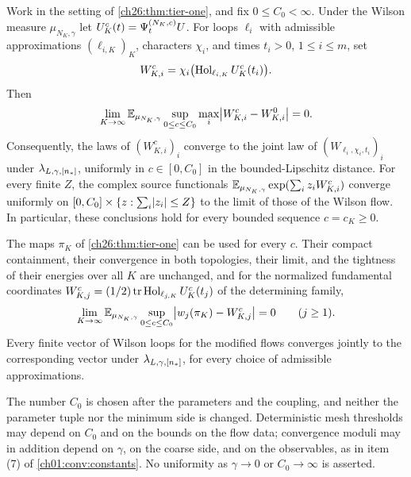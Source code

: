 \begin{theorem}\label{ch26:thm:bounded-quartic-flow-universality}
Work in the setting of \cref{ch26:thm:tier-one}, and fix $0\le C_0<\infty$. Under the Wilson measure $\mu_{N_K,\gamma}$ let $U_K^c(t)=\Psi^{(N_K,c)}_tU$. For loops $\ell_i$ with admissible approximations $(\ell_{i,K})_K$, characters $\chi_i$, and times $t_i>0$, $1\le i\le m$, set
\[
 W^c_{K,i}=\chi_i\bigl(\operatorname{Hol}_{\ell_{i,K}}U^c_K(t_i)\bigr).
\]
Then
\begin{equation}\label{ch26:eq:alternative-original-comparison}
 \lim_{K\to\infty}\mathbb E_{\mu_{N_K,\gamma}}\sup_{0\le c\le C_0}\max_i\bigl\lvert W^c_{K,i}-W^0_{K,i}\bigr\rvert=0.
\end{equation}
Consequently, the laws of $(W^c_{K,i})_i$ converge to the joint law of $(W_{\ell_i,\chi_i,t_i})_i$ under $\lambda_{L,\gamma,[n_*]}$, uniformly in $c\in[0,C_0]$ in the bounded-Lipschitz distance. For every finite $Z$, the complex source functionals $\mathbb E_{\mu_{N_K,\gamma}}\exp(\sum_iz_iW^c_{K,i})$ converge uniformly on $[0,C_0]\times\{z:\sum_i\lvert z_i\rvert\le Z\}$ to the limit of those of the Wilson flow. In particular, these conclusions hold for every bounded sequence $c=c_K\ge0$.

The maps $\pi_K$ of \cref{ch26:thm:tier-one} can be used for every $c$. Their compact containment, their convergence in both topologies, their limit, and the tightness of their energies over all $K$ are unchanged, and for the normalized fundamental coordinates $W^c_{K,j}=(1/2)\operatorname{tr}\operatorname{Hol}_{\ell_{j,K}}U^c_K(t_j)$ of the determining family,
\begin{equation}\label{ch26:eq:alternative-orbit-fidelity}
 \lim_{K\to\infty}\mathbb E_{\mu_{N_K,\gamma}}\sup_{0\le c\le C_0}\bigl\lvert w_j(\pi_K)-W^c_{K,j}\bigr\rvert=0\qquad(j\ge1).
\end{equation}
Every finite vector of Wilson loops for the modified flows converges jointly to the corresponding vector under $\lambda_{L,\gamma,[n_*]}$, for every choice of admissible approximations.

The number $C_0$ is chosen after the parameters and the coupling, and neither the parameter tuple nor the minimum side is changed. Deterministic mesh thresholds may depend on $C_0$ and on the bounds on the flow data; convergence moduli may in addition depend on $\gamma$, on the coarse side, and on the observables, as in item (7) of \cref{ch01:conv:constants}. No uniformity as $\gamma\to0$ or $C_0\to\infty$ is asserted.
\end{theorem}

